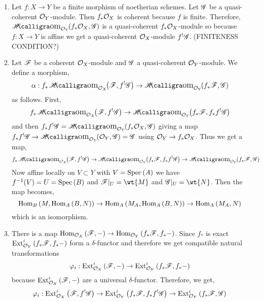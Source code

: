 \documentclass[12pt]{article}
\begin{document}
\begin{enumerate}
\item Let $f : X \to Y$ be  a finite morphism of noetherian schemes. Let $\mathscr{G}$ be a quasi-coherent $\mathcal{O}_{Y}$-module. Then $f_* \mathcal{O}_{X}$ is coherent because $f$ is finite. Therefore, $\shHom{\struct{Y}}{f_* \struct{X}}{\G}$ is a quasi-coherent $f_* \mathcal{O}_{X}$-module so because $f : X \to Y$ is affine we get a quasi-coherent $\mathcal{O}_{X}$-module $f^! \mathscr{G}$.
(FINITENESS CONDITION?)

\item Let $\mathscr{F}$ be a coherent $\mathcal{O}_{X}$-module and $\mathscr{G}$ a quasi-coherent $\mathcal{O}_{Y}$-module. We define a morphism,
\[ \alpha : f_* \shHom{\struct{X}}{\F}{f^! \G} \to \shHom{\struct{Y}}{f_* \F}{\G} \]
as follows. First,
\[ f_* \shHom{\struct{X}}{\F}{f^! \G} \to \shHom{\struct{Y}}{f_* \F}{f_* f^! \G} \]
and then $f_* f^! \G = \shHom{\struct{Y}}{f_* \struct{X}}{\G}$ giving a map $f_* f^! \G \to \shHom{\struct{Y}}{\struct{Y}}{\G} = \G$ using $\mathcal{O}_{Y} \to f_* \mathcal{O}_{X}$. Thus we get a map,
\[ f_* \shHom{\struct{X}}{\F}{f^! \G} \to \shHom{\struct{Y}}{f_* \F}{f_* f^! \G} \to \shHom{\struct{Y}}{f_* \F}{\G} \]
Now affine locally on $V \subset Y$ with $V = \mathrm{Spec}\left( A \right)$ we have $f^{-1}(V) = U = \mathrm{Spec}\left( B \right)$ and $\F|_U = \wt{M}$ and $\G|_U = \wt{N}$. Then the map becomes,
\[ \mathrm{Hom}_{B} \left( M, \mathrm{Hom}_{A} \left( B, N \right) \right) \to \mathrm{Hom}_{A} \left( M_A, \mathrm{Hom}_{A} \left( B, N \right) \right) \to \mathrm{Hom}_{A} \left( M_A, N \right) \] 
which is an isomorphism.

\item There is a map $\mathrm{Hom}_{\mathcal{O}_{X}} \left( \mathscr{F}, - \right) \to \mathrm{Hom}_{\mathcal{O}_{Y}} \left( f_* \mathscr{F}, f_*- \right)$. Since $f_*$ is exact $\mathrm{Ext}^{i}_{\mathcal{O}_{Y}} \left( f_* \mathscr{F}, f_* - \right)$ form a $\delta$-functor and therefore we get compatible natural transformations
\[ \varphi_i : \mathrm{Ext}^{i}_{\mathcal{O}_{X}} \left( \mathscr{F}, - \right) \to \mathrm{Ext}^{i}_{\mathcal{O}_{Y}} \left( f_* \mathscr{F}, f_* - \right) \]
because $\mathrm{Ext}^{i}_{\mathcal{O}_{X}} \left( \mathscr{F}, - \right)$ are a universal $\delta$-functor. Therefore, we get,
\[ \varphi_i : \mathrm{Ext}^{i}_{\mathcal{O}_{X}} \left( \mathscr{F}, f^! \mathscr{G} \right) \to \mathrm{Ext}^{i}_{\mathcal{O}_{Y}} \left( f_* \mathscr{F}, f_* f^! \mathscr{G} \right) \to \mathrm{Ext}^{i}_{\mathcal{O}_{Y}} \left( f_* \mathscr{F}, \mathscr{G} \right) \]


\end{enumerate}
\end{document}
